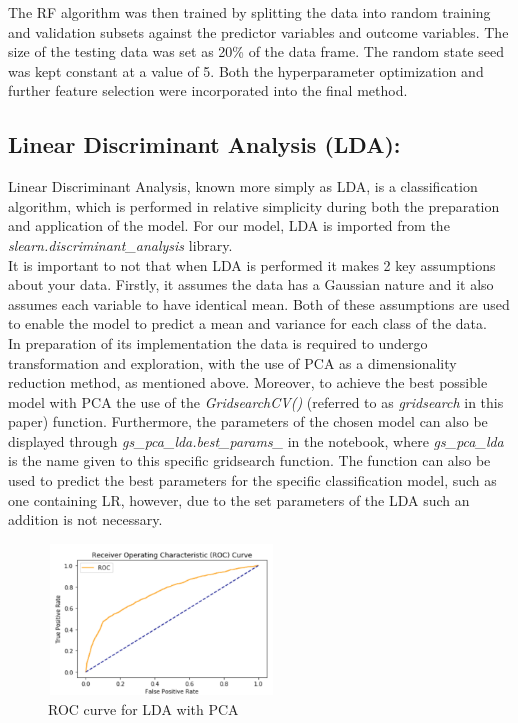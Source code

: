 \documentclass{article}
\begin{document}
The RF algorithm was then trained by splitting the data into random training and validation subsets against the predictor variables and outcome variables. The size of the testing data was set as 20\% of the data frame. The random state seed was kept constant at a value of 5. Both the hyperparameter optimization and further feature selection were incorporated into the final method. 

\subsection{Linear Discriminant Analysis (LDA):}
Linear Discriminant Analysis, known more simply as LDA\cite{lda}, is a classification algorithm, which is performed in relative simplicity during both the preparation and application of the model. For our model, LDA is imported from the \textit{slearn.discriminant\_analysis} library. \\

It is important to not that when LDA\cite{sci-lda} is performed it makes 2 key assumptions about your data. Firstly, it assumes the data has a Gaussian nature and it also assumes each variable to have identical mean. Both of these assumptions are used to enable the model to predict a mean and variance for each class of the data. \\

In preparation of its implementation the data is required to undergo transformation and exploration, with the use of PCA as a dimensionality reduction method, as mentioned above. Moreover, to achieve the best possible model with PCA the use of the \textit{GridsearchCV()} (referred to as \textit{gridsearch} in this paper) function. Furthermore, the parameters of the chosen model can also be displayed through \textit{gs\_pca\_lda.best\_params\_} in the notebook, where \textit{gs\_pca\_lda} is the name given to this specific gridsearch function. The function can also be used to predict the best parameters for the specific classification model, such as one containing LR, however, due to the set parameters of the LDA such an addition is not necessary. 

\begin{figure}[h]
 \centering
 \includegraphics[width=6cm, height=4cm]{lda-roc.png}
 \caption{ROC curve for LDA with PCA}
\end{figure}
							
\end{document}
